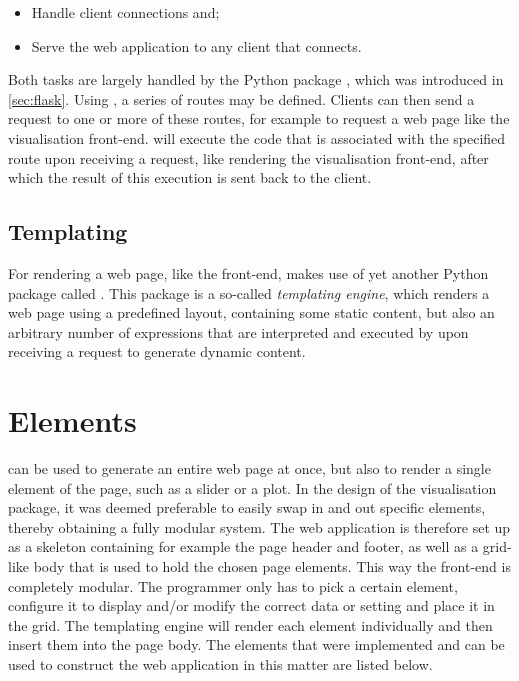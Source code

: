 \documentclass[a4paper, openany, oneside]{memoir}
\begin{document}
\begin{itemize}
	\item Handle client connections and;
	\item Serve the web application to any client that connects.
\end{itemize}

Both tasks are largely handled by the Python package , which was introduced in \cref{sec:flask}. Using , a series of routes may be defined. Clients can then send a request to one or more of these routes, for example to request a web page like the visualisation front-end.  will execute the code that is associated with the specified route upon receiving a request, like rendering the visualisation front-end, after which the result of this execution is sent back to the client.

\subsection{Templating}
\label{sec:templating}
For rendering a web page, like the front-end,  makes use of yet another Python package called . This package is a so-called \emph{templating engine}, which renders a web page using a predefined layout, containing some static content, but also an arbitrary number of expressions that are interpreted and executed by  upon receiving a request to generate dynamic content.

\section{Elements}
\label{sec:elements}
 can be used to generate an entire web page at once, but also to render a single element of the page, such as a slider or a plot. In the design of the visualisation package, it was deemed preferable to easily swap in and out specific elements, thereby obtaining a fully modular system. The web application is therefore set up as a skeleton containing for example the page header and footer, as well as a grid-like body that is used to hold the chosen page elements. This way the front-end is completely modular. The programmer only has to pick a certain element, configure it to display and/or modify the correct data or setting and place it in the grid. The templating engine will render each element individually and then insert them into the page body. The elements that were implemented and can be used to construct the web application in this matter are listed below.
\end{document}
